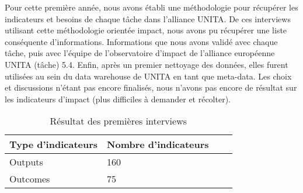 Pour cette première année, nous avons établi une méthodologie pour récupérer les indicateurs et besoins de chaque tâche dans l'alliance UNITA. De ces interviews utilisant cette méthodologie orientée impact, nous avons pu récupérer une liste conséquente d'informations. Informations que nous avons validé avec chaque tâche, puis avec l'équipe de l'observatoire d'impact de l'alliance européenne UNITA (tâche) 5.4. Enfin, après un premier nettoyage des données, elles furent utilisées au sein du data warehouse de UNITA en tant que meta-data. Les choix et discussions n'étant pas encore finalisés, nous n'avons pas encore de résultat sur les indicateurs d'impact (plus difficiles à demander et récolter). 
\begin{table}[h]
  \caption{Résultat des premières interviews}
  \begin{center}
    \begin{tabular}{|l|l|l|l|} \hline
    \textbf{Type d'indicateurs} & \textbf{Nombre d'indicateurs} \\ \hline
    Outputs & 160 \\ \hline
    Outcomes & 75 \\ \hline
    \end{tabular}
  \end{center}
\end{table}